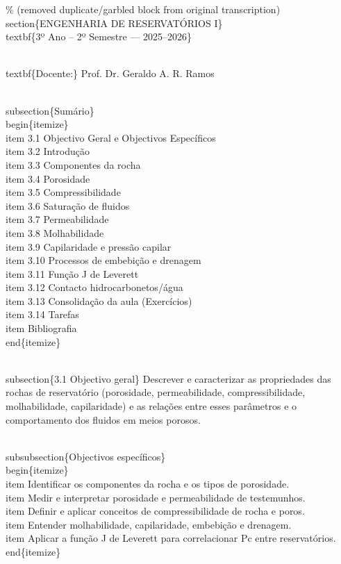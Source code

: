 \documentclass[11pt,a4paper]{article}
\begin{document}
\begin{enumerate}
{\% (removed duplicate/garbled block from original transcription)
\\section\{ENGENHARIA DE RESERVATÓRIOS I\}
\\textbf\{3º Ano – 2º Semestre — 2025–2026\}

\\textbf\{Docente:\} Prof. Dr. Geraldo A. R. Ramos


\\subsection\{Sumário\}
\\begin\{itemize\}
\\item 3.1 Objectivo Geral e Objectivos Específicos
\\item 3.2 Introdução
\\item 3.3 Componentes da rocha
\\item 3.4 Porosidade
\\item 3.5 Compressibilidade
\\item 3.6 Saturação de fluidos
\\item 3.7 Permeabilidade
\\item 3.8 Molhabilidade
\\item 3.9 Capilaridade e pressão capilar
\\item 3.10 Processos de embebição e drenagem
\\item 3.11 Função J de Leverett
\\item 3.12 Contacto hidrocarbonetos/água
\\item 3.13 Consolidação da aula (Exercícios)
\\item 3.14 Tarefas
\\item Bibliografia
\\end\{itemize\}


\\subsection\{3.1 Objectivo geral\}
Descrever e caracterizar as propriedades das rochas de reservatório (porosidade, permeabilidade, compressibilidade, molhabilidade, capilaridade) e as relações entre esses parâmetros e o comportamento dos fluidos em meios porosos.

\\subsubsection\{Objectivos específicos\}
\\begin\{itemize\}
\\item Identificar os componentes da rocha e os tipos de porosidade.
\\item Medir e interpretar porosidade e permeabilidade de testemunhos.
\\item Definir e aplicar conceitos de compressibilidade de rocha e poros.
\\item Entender molhabilidade, capilaridade, embebição e drenagem.
\\item Aplicar a função J de Leverett para correlacionar Pc entre reservatórios.
\\end\{itemize\}

}
\end{enumerate}
\end{document}
